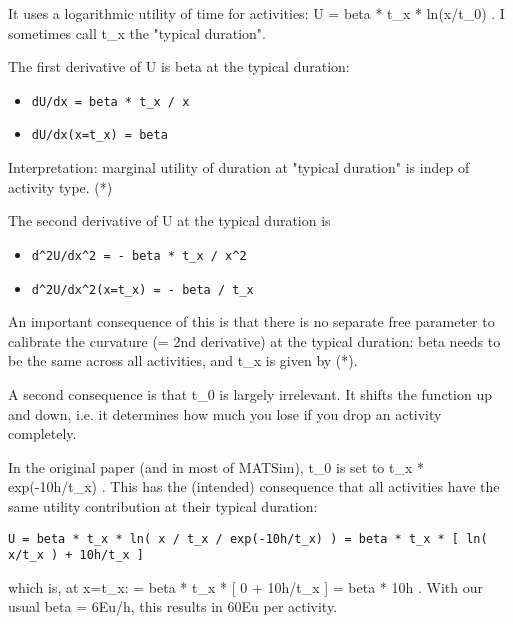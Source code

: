 It uses a logarithmic utility of time for activities: U = beta * t\_x *  ln(x/t\_0) . I sometimes call t\_x the "typical duration".

The first derivative of U is beta at the typical duration:
\begin{itemize}
	\item 
\begin{verbatim}
dU/dx = beta * t_x / x
\end{verbatim}
	\item 
\begin{verbatim}
dU/dx(x=t_x) = beta
\end{verbatim}
\end{itemize}

Interpretation: marginal utility of duration at "typical duration" is indep of activity type. (*)

The second derivative of U at the typical duration is
\begin{itemize}
	\item 
\begin{verbatim}
d^2U/dx^2 = - beta * t_x / x^2
\end{verbatim}
	\item 
\begin{verbatim}
d^2U/dx^2(x=t_x) = - beta / t_x
\end{verbatim}
\end{itemize}

An  important consequence of this is that there is no separate  free  parameter to calibrate the curvature (= 2nd derivative) at the  typical  duration: beta needs to be the same across all activities, and  t\_x is  given by (*).

A second consequence is that t\_0 is largely  irrelevant. It  shifts the function up and down, i.e. it determines how  much you lose  if you drop an activity completely.



In the  original paper (and in most of MATSim), t\_0 is set to t\_x *   exp(-10h/t\_x) . This has the (intended) consequence that all  activities  have the same utility contribution at their typical  duration:
\begin{verbatim}
U = beta * t_x * ln( x / t_x / exp(-10h/t_x) ) = beta * t_x * [ ln( x/t_x ) + 10h/t_x ]
\end{verbatim}

which   is, at x=t\_x: = beta * t\_x * [ 0 + 10h/t\_x ] = beta *  10h . With  our usual beta = 6Eu/h, this results in 60Eu per  activity.

